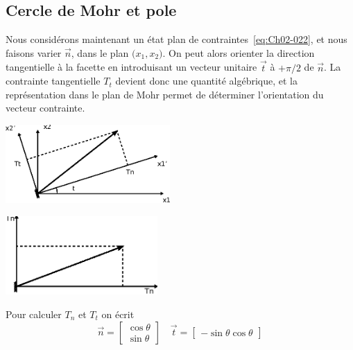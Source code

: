 \subsection{Cercle de Mohr et pole} \label{ssec:Ch02-3.2}
Nous considérons maintenant un état plan de contraintes~\eqref{eq:Ch02-022}, et nous faisons varier $\vec{n}$, dans le plan $\bigl( x_1,x_2 \bigr)$.
On peut alors orienter la direction tangentielle à la facette en introduisant un vecteur unitaire $\vec{t}$ à $+\pi/2$ de $\vec{n}$.
La contrainte tangentielle $T_t$ devient donc une quantité algébrique, et la représentation dans le plan de Mohr permet de déterminer l'orientation du vecteur contrainte. 
\begin{multicols}{2}
    \begin{center}
        \includegraphics[height=3cm]{../images/T1_Ch02-0016a}
    \end{center}
    \columnbreak
    \begin{center}
        \includegraphics[height=3cm]{../images/T1_Ch02-0016b}
    \end{center}
\end{multicols}
Pour calculer $T_n$ et $T_t$ on écrit
\begin{displaymath}
    \vec{n} = 
    \begin{bmatrix}
        \cos \theta\\
        \sin \theta
    \end{bmatrix}
    \quad
    \vec{t} = 
    \begin{bmatrix}
        -\sin \theta
        \cos \theta
    \end{bmatrix}
\end{displaymath}
